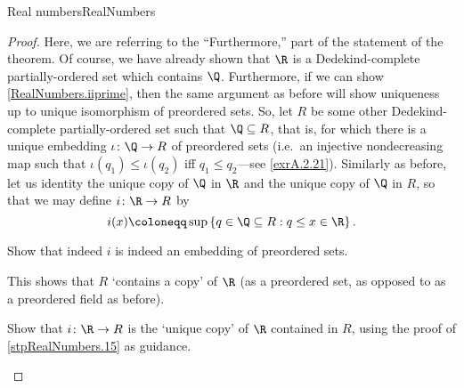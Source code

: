 \begin{thm}{Real numbers}{RealNumbers}
\begin{proof}
Here, we are referring to the ``Furthermore,\textellipsis '' part of the statement of the theorem.  Of course, we have already shown that $\R$ is a Dedekind-complete partially-ordered set which contains $\Q$.  Furthermore, if we can show \cref{RealNumbers.iiprime}, then the same argument as before will show uniqueness up to unique isomorphism of preordered sets.  So, let $R$ be some other Dedekind-complete partially-ordered set such that $\Q \subseteq R$, that is, for which there is a unique embedding $\iota \colon \Q \rightarrow R$ of preordered sets (i.e.~an injective nondecreasing map such that $\iota (q_1)\leq \iota (q_2)$ iff $q_1\leq q_2$---see \cref{exrA.2.21}).  Similarly as before, let us identity the unique copy of $\Q$ in $\R$ and the unique copy of $\Q$ in $R$, so that we may define $i\colon \R \rightarrow R$ by
\begin{equation}
i(x)\coloneqq \sup \left\{ q\in \Q \subseteq R:q\leq x\in \R \right\} .
\end{equation}
\begin{exr}[breakable=false]{}{}
Show that indeed $i$ is indeed an embedding of preordered sets.
\end{exr}
This shows that $R$ `contains a copy' of $\R$ (as a preordered set, as opposed to as a preordered field as before).
\begin{exr}[breakable=false]{}{}
Show that $i\colon \R \rightarrow R$ is the `unique copy' of $\R$ contained in $R$, using the proof of \cref{stpRealNumbers.15} as guidance.
\end{exr}
\end{proof}
\end{thm}

